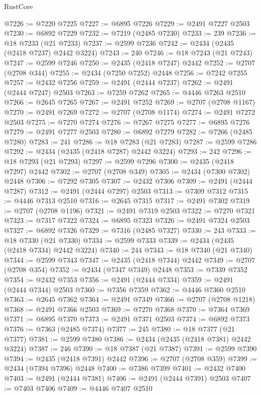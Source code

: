 \begin{lexlean}{RustCore}
\begin{coremodule}
@7226 := @7220 @7225
@7227 := @6895 @7226
@7229 := @2491 @7227 @2503
@7230 := @6892 @7229
@7232 := @7219 (@2485 @7230)
@7233 := 239
@7236 := @18 @7233 (@21 @7233)
@7237 := @2599 @7236
@7242 := @2434 (@2435 (@2418 @7237) @2442 @3224)
@7243 := 240
@7246 := @18 @7243 (@21 @7243)
@7247 := @2599 @7246
@7250 := @2435 (@2418 @7247) @2442
@7252 := @2707 (@2708 @344)
@7255 := @2434 (@7250 @7252) @2448
@7256 := @7242 @7255
@7257 := @2432 @7256
@7259 := @2491 (@2444 @7237)
@7262 := @2491 (@2444 @7247) @2503
@7263 := @7259 @7262
@7265 := @4446 @7263 @2510
@7266 := @2645 @7265
@7267 := @2491 @7252
@7269 := @2707 (@2708 @1167)
@7270 := @2491 @7269
@7272 := @2707 (@2708 @1174)
@7274 := @2491 @7272 @2503
@7275 := @7270 @7274
@7276 := @7267 @7275
@7277 := @6895 @7276
@7279 := @2491 @7277 @2503
@7280 := @6892 @7279
@7282 := @7266 (@2485 @7280)
@7283 := 241
@7286 := @18 @7283 (@21 @7283)
@7287 := @2599 @7286
@7292 := @2434 (@2435 (@2418 @7287) @2442 @3224)
@7293 := 242
@7296 := @18 @7293 (@21 @7293)
@7297 := @2599 @7296
@7300 := @2435 (@2418 @7297) @2442
@7302 := @2707 (@2708 @349)
@7305 := @2434 (@7300 @7302) @2448
@7306 := @7292 @7305
@7307 := @2432 @7306
@7309 := @2491 (@2444 @7287)
@7312 := @2491 (@2444 @7297) @2503
@7313 := @7309 @7312
@7315 := @4446 @7313 @2510
@7316 := @2645 @7315
@7317 := @2491 @7302
@7319 := @2707 (@2708 @1196)
@7321 := @2491 @7319 @2503
@7322 := @7270 @7321
@7323 := @7317 @7322
@7324 := @6895 @7323
@7326 := @2491 @7324 @2503
@7327 := @6892 @7326
@7329 := @7316 (@2485 @7327)
@7330 := 243
@7333 := @18 @7330 (@21 @7330)
@7334 := @2599 @7333
@7339 := @2434 (@2435 (@2418 @7334) @2442 @3224)
@7340 := 244
@7343 := @18 @7340 (@21 @7340)
@7344 := @2599 @7343
@7347 := @2435 (@2418 @7344) @2442
@7349 := @2707 (@2708 @354)
@7352 := @2434 (@7347 @7349) @2448
@7353 := @7339 @7352
@7354 := @2432 @7353
@7356 := @2491 (@2444 @7334)
@7359 := @2491 (@2444 @7344) @2503
@7360 := @7356 @7359
@7362 := @4446 @7360 @2510
@7363 := @2645 @7362
@7364 := @2491 @7349
@7366 := @2707 (@2708 @1218)
@7368 := @2491 @7366 @2503
@7369 := @7270 @7368
@7370 := @7364 @7369
@7371 := @6895 @7370
@7373 := @2491 @7371 @2503
@7374 := @6892 @7373
@7376 := @7363 (@2485 @7374)
@7377 := 245
@7380 := @18 @7377 (@21 @7377)
@7381 := @2599 @7380
@7386 := @2434 (@2435 (@2418 @7381) @2442 @3224)
@7387 := 246
@7390 := @18 @7387 (@21 @7387)
@7391 := @2599 @7390
@7394 := @2435 (@2418 @7391) @2442
@7396 := @2707 (@2708 @359)
@7399 := @2434 (@7394 @7396) @2448
@7400 := @7386 @7399
@7401 := @2432 @7400
@7403 := @2491 (@2444 @7381)
@7406 := @2491 (@2444 @7391) @2503
@7407 := @7403 @7406
@7409 := @4446 @7407 @2510

\end{coremodule}
\end{lexlean}
